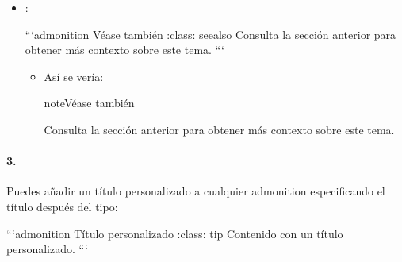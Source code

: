 \documentclass[a4paper,10pt,oneside,spanish,openany]{sphinxmanual}
\begin{document}
\begin{itemize}
\begin{sphinxVerbatim}[commandchars=\\\{\}]
  ```\PYGZob{}admonition\PYGZcb{} Pista :class: hint Aquí hay una sugerencia útil para facilitar tu tarea. ```
\end{sphinxVerbatim}
\begin{itemize}
\item {} 
\sphinxAtStartPar
Así se vería:

\begin{sphinxadmonition}{note}{Pista}

\sphinxAtStartPar
Aquí hay una sugerencia útil para facilitar tu tarea.
\end{sphinxadmonition}

\end{itemize}

\item {} 
\sphinxAtStartPar
{}:

\begin{sphinxVerbatim}[commandchars=\\\{\}]
  ```\PYGZob{}admonition\PYGZcb{} Véase también :class: seealso  Consulta la sección anterior para obtener más contexto sobre este tema. ```
\end{sphinxVerbatim}
\begin{itemize}
\item {} 
\sphinxAtStartPar
Así se vería:

\begin{sphinxadmonition}{note}{Véase también}

\sphinxAtStartPar
Consulta la sección anterior para obtener más contexto sobre este tema.
\end{sphinxadmonition}

\end{itemize}

\end{itemize}


\paragraph{3. }
\label{\detokenize{configuracion_inicial/013.guia_de_myst_parser:admonitions-con-titulos-personalizados}}
\sphinxAtStartPar
Puedes añadir un título personalizado a cualquier admonition especificando el título después del tipo:

\begin{sphinxVerbatim}[commandchars=\\\{\}]
  ```\PYGZob{}admonition\PYGZcb{} Título personalizado :class: tip Contenido con un título personalizado. ```
\end{sphinxVerbatim}
\end{document}
